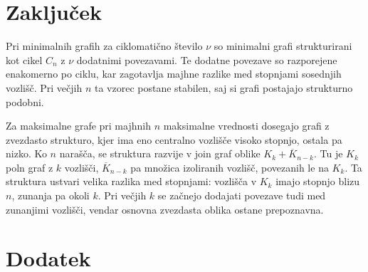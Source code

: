 \documentclass[fin1, tisk]{fmfdelo}
\begin{document}
\section{Zaključek}

Pri minimalnih grafih za ciklomatično število $\nu$ so minimalni grafi strukturirani kot cikel $C_n$ z $\nu$ dodatnimi 
povezavami. Te dodatne povezave so razporejene enakomerno po ciklu, kar zagotavlja majhne razlike med stopnjami 
sosednjih vozlišč. Pri večjih $n$ ta vzorec postane stabilen, saj si grafi postajajo strukturno podobni.

Za maksimalne grafe pri majhnih $n$ maksimalne vrednosti dosegajo grafi z zvezdasto strukturo, kjer ima eno centralno 
vozlišče visoko stopnjo, ostala pa nizko. Ko $n$ narašča, se struktura razvije v join graf oblike $K_k + \overline{K}_{n-k}$. 
Tu je $K_k$ poln graf z $k$ vozlišči, $\overline{K}_{n-k}$ pa množica izoliranih vozlišč, povezanih le na $K_k$. 
Ta struktura ustvari velika razlika med stopnjami: vozlišča v $K_k$ imajo stopnjo blizu $n$, zunanja pa okoli $k$. 
Pri večjih $k$ se začnejo dodajati povezave tudi med zunanjimi vozlišči, vendar osnovna zvezdasta oblika ostane prepoznavna.

\newpage
\section{Dodatek}


\end{document}
